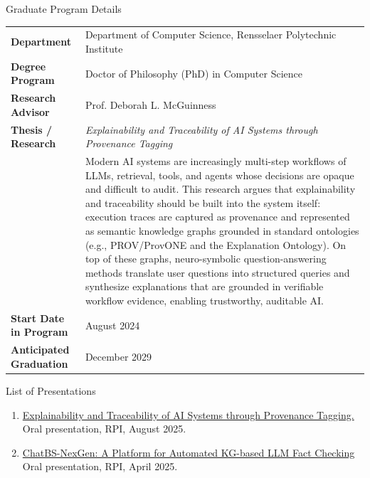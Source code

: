 \documentclass{resume} %
\newcommand{\ph}[1]{\textcolor{red}{[#1]}}
\begin{document}
\begin{rSection}{Graduate Program Details}
\begin{tabular}{ @{} >{\bfseries}l @{\hspace{4ex}} p{} }
Department & Department of Computer Science, Rensselaer Polytechnic Institute \\[3pt]
Degree Program & Doctor of Philosophy (PhD) in Computer Science \\[3pt]
Research Advisor & Prof. Deborah L. McGuinness \\[3pt]
Thesis / Research & \textit{Explainability and Traceability of AI Systems through
Provenance Tagging} \\
 & Modern AI systems are increasingly multi-step workflows of LLMs, retrieval, tools, and agents whose decisions are opaque and difficult to audit. This research argues that explainability and traceability should be built into the system itself: execution traces are captured as provenance and represented as semantic knowledge graphs grounded in standard ontologies (e.g., PROV/ProvONE and the Explanation Ontology). On top of these graphs, neuro-symbolic question-answering methods translate user questions into structured queries and synthesize explanations that are grounded in verifiable workflow evidence, enabling trustworthy, auditable AI. \\[3pt]
Start Date in Program & August 2024 \\[3pt]
Anticipated Graduation & December 2029 \\
\end{tabular}
\end{rSection}
\vspace{0.05em}
\begin{rSection}{List of Presentations}
\vspace{0.25em}
\begin{enumerate}
  \itemsep 2pt
  \item \href{https://tw.rpi.edu/project/workflow-explorer-explainable-ai-through-provenance-tagging}{Explainability and Traceability of AI Systems through Provenance Tagging.} Oral presentation, RPI, August 2025.

  \item \href{https://www.youtube.com/watch?v=DiXwEkfUw0o}{ChatBS-NexGen: A Platform for Automated KG-based LLM Fact Checking} Oral presentation, RPI, April 2025.


\end{enumerate}
\end{rSection}
\end{document}
